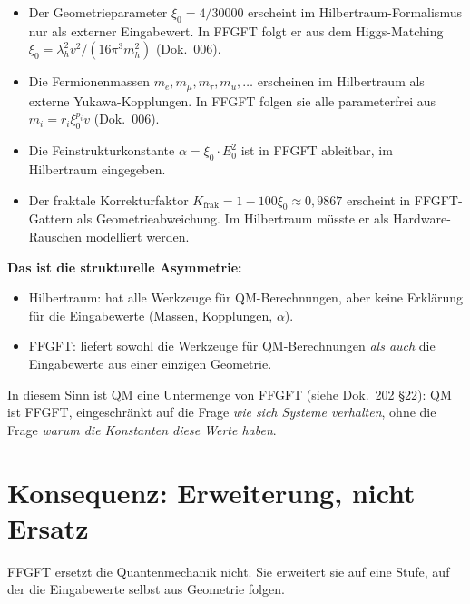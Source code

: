 \begin{itemize}[leftmargin=2em,itemsep=2pt,topsep=2pt]
  \item Der Geometrieparameter $\xi_0 = 4/30000$ erscheint im
        Hilbertraum-Formalismus nur als externer Eingabewert. In
        FFGFT folgt er aus dem Higgs-Matching $\xi_0 = \lambda_h^2
        v^2/(16\pi^3 m_h^2)$ (Dok.~006).
  \item Die Fermionenmassen $m_e, m_\mu, m_\tau, m_u, \ldots$
        erscheinen im Hilbertraum als externe Yukawa-Kopplungen.
        In FFGFT folgen sie alle parameterfrei aus
        $m_i = r_i \xi_0^{p_i} v$ (Dok.~006).
  \item Die Feinstrukturkonstante $\alpha = \xi_0 \cdot E_0^2$ ist
        in FFGFT ableitbar, im Hilbertraum eingegeben.
  \item Der fraktale Korrekturfaktor $K_{\text{frak}} = 1 - 100\xi_0
        \approx 0{,}9867$ erscheint in FFGFT-Gattern als
        Geometrieabweichung. Im Hilbertraum müsste er als Hardware-
        Rauschen modelliert werden.
\end{itemize}

\textbf{Das ist die strukturelle Asymmetrie:}
\begin{itemize}[leftmargin=2em,itemsep=2pt,topsep=2pt]
  \item Hilbertraum: hat alle Werkzeuge für QM-Berechnungen, aber
        keine Erklärung für die Eingabewerte (Massen, Kopplungen,
        $\alpha$).
  \item FFGFT: liefert sowohl die Werkzeuge für QM-Berechnungen
        \emph{als auch} die Eingabewerte aus einer einzigen
        Geometrie.
\end{itemize}

In diesem Sinn ist QM eine Untermenge von FFGFT (siehe Dok.~202 §22):
QM ist FFGFT, eingeschränkt auf die Frage \emph{wie sich Systeme
verhalten}, ohne die Frage \emph{warum die Konstanten diese Werte
haben}.

\section{Konsequenz: Erweiterung, nicht Ersatz}

FFGFT ersetzt die Quantenmechanik nicht. Sie erweitert sie auf eine
Stufe, auf der die Eingabewerte selbst aus Geometrie folgen.

